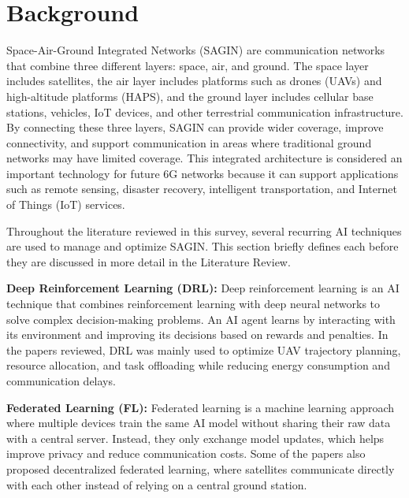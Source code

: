 \documentclass[letterpaper]{article} %
\begin{document}
\section{Background}
Space-Air-Ground Integrated Networks (SAGIN) are communication networks that combine three different layers: space, air, and ground. The space layer includes satellites, the air layer includes platforms such as drones (UAVs) and high-altitude platforms (HAPS), and the ground layer includes cellular base stations, vehicles, IoT devices, and other terrestrial communication infrastructure. By connecting these three layers, SAGIN can provide wider coverage, improve connectivity, and support communication in areas where traditional ground networks may have limited coverage. This integrated architecture is considered an important technology for future 6G networks because it can support applications such as remote sensing, disaster recovery, intelligent transportation, and Internet of Things (IoT) services.

Throughout the literature reviewed in this survey, several recurring AI techniques are used to manage and optimize SAGIN. This section briefly defines each before they are discussed in more detail in the Literature Review.

\textbf{Deep Reinforcement Learning (DRL):} Deep reinforcement learning is an AI technique that combines reinforcement learning with deep neural networks to solve complex decision-making problems. An AI agent learns by interacting with its environment and improving its decisions based on rewards and penalties. In the papers reviewed, DRL was mainly used to optimize UAV trajectory planning, resource allocation, and task offloading while reducing energy consumption and communication delays.

\textbf{Federated Learning (FL):} Federated learning is a machine learning approach where multiple devices train the same AI model without sharing their raw data with a central server. Instead, they only exchange model updates, which helps improve privacy and reduce communication costs. Some of the papers also proposed decentralized federated learning, where satellites communicate directly with each other instead of relying on a central ground station.
\end{document}
